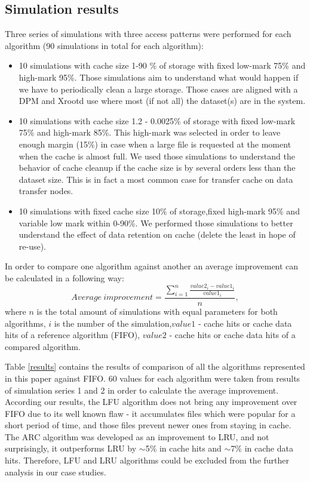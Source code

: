 \documentclass[english]{ddny}
\begin{document}
\subsection{Simulation results}
Three series of simulations with three access patterns were performed for each algorithm (90 simulations in total for each algorithm): 
\begin{itemize}
\item 10 simulations with cache size 1-90 \% of storage with fixed low-mark 75\% and high-mark 95\%. Those simulations aim to understand what would happen if we have to periodically clean a large storage. Those cases are aligned with a DPM and Xrootd use where most (if not all) the dataset(s) are in the system.
\item 10 simulations with cache size 1.2 - 0.0025\% of storage with fixed low-mark 75\% and high-mark 85\%. This high-mark was selected in order to leave enough margin (15\%) in case when a large file is requested at the moment when the cache is almost full. We used those simulations to understand the behavior of cache cleanup if the cache size is by several orders less than the dataset size. This is in fact a most common case for transfer cache on data transfer nodes.
\item 10 simulations with fixed cache size 10\% of storage,fixed high-mark 95\% and  variable low mark  within 0-90\%. We performed those simulations to better understand the effect of data retention on cache (delete the least in hope of re-use).
\end{itemize}

In order to compare one algorithm against another an average improvement can be calculated in a following way:
\begin{equation}
Average~improvement = \frac{\sum^{n}_{i=1}\frac{value2_{i}-value1_{i}}{value1_{i}}}{n},
\end{equation}
where $n$ is the total amount of simulations with equal parameters for both algorithms, $i$ is the number of the simulation,$value1$ - cache hits or cache data hits of a reference algorithm (FIFO), $value2$ - cache hits or cache data hits of a compared algorithm.

Table \ref{results} contains the results of comparison of all the algorithms represented in this paper against FIFO. 60 values for each algorithm were taken from results of simulation series 1 and 2 in order to calculate the average improvement. According our results, the LFU algorithm does not bring any improvement over FIFO due to its well known flaw - it accumulates files which were popular for a short period of time, and those files prevent newer ones from staying in cache. The ARC algorithm was developed as an improvement to LRU, and not surprisingly, it outperforms LRU by $\sim$5\% in cache hits and $\sim$7\% in cache data hits. Therefore, LFU and LRU algorithms could be excluded from the further analysis in our case studies.
\end{document}
